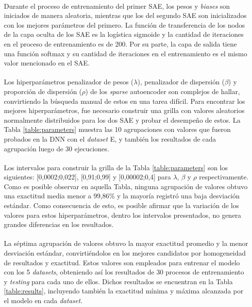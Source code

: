 \documentclass[a4paper,12pt]{article}
\begin{document}
\paragraph{}
Durante el proceso de entrenamiento del primer SAE, los pesos y \textit{biases} son iniciados de manera aleatoria, mientras que los del segundo SAE son inicializados con los mejores parámetros del primero. La función de transferencia de los nodos de la capa oculta de los SAE es la logística sigmoide y la cantidad de iteraciones en el proceso de entrenamiento es de 200. Por su parte, la capa de salida tiene una función softmax y su cantidad de iteraciones en el entrenamiento es el mismo valor mencionado en el SAE. 

\paragraph{}
Los hiperparámetros penalizador de pesos ($\lambda$), penalizador de dispersión ($\beta$) y proporción de dispersión ($\rho$) de los \textit{sparse} autoencoder son complejos de hallar, convirtiendo la búsqueda manual de estos en una tarea difícil. Para encontrar los mejores hiperparámetros, fue necesario construir una grilla con valores aleatorios normalmente distribuidos para los dos SAE y probar el desempeño de estos. La Tabla \ref{table:parameters} muestra las 10 agrupaciones con valores que fueron probados en la DNN con el \textit{dataset} E, y también los resultados de cada agrupación luego de 30 ejecuciones.

\paragraph{}
Los intervalos para construir la grilla de la Tabla \ref{table:parameters} son los siguientes: [0,0002;0,022], [0,91;0,99] y [0,00002;0,4] para $\lambda$, $\beta$ y $\rho$ respectivamente. Como es posible observar en aquella Tabla, ninguna agrupación de valores obtuvo una exactitud media menor a 99,86\% y la mayoría registró una baja desviación estándar. Como consecuencia de esto, es posible afirmar que la variación de los valores para estos hiperparámetros, dentro los intervalos presentados, no genera grandes diferencias en los resultados.

\paragraph{}
La séptima agrupación de valores obtuvo la mayor exactitud promedio y la menor desviación estándar, convirtiéndolos en los mejores candidatos por homogeneidad de resultados y exactitud. Estos valores son empleados para entrenar el modelo con los 5 \textit{datasets}, obteniendo así los resultados de 30 procesos de entrenamiento y \textit{testing} para cada uno de ellos. Dichos resultados se encuentran en la Tabla \ref{table:results}, incluyendo también la exactitud mínima y máxima alcanzada por el modelo en cada \textit{dataset}.
\end{document}
